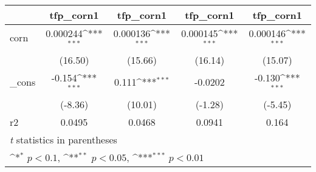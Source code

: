 {
\def\sym#1{\ifmmode^{#1}\else\(^{#1}\)\fi}
\begin{tabular}{l*{4}{c}}
\hline\hline
            &\multicolumn{1}{c}{tfp\_corn1}&\multicolumn{1}{c}{tfp\_corn1}&\multicolumn{1}{c}{tfp\_corn1}&\multicolumn{1}{c}{tfp\_corn1}\\
\hline
corn        &    0.000244\sym{***}&    0.000136\sym{***}&    0.000145\sym{***}&    0.000146\sym{***}\\
            &     (16.50)         &     (15.66)         &     (16.14)         &     (15.07)         \\
[1em]
\_cons      &      -0.154\sym{***}&       0.111\sym{***}&     -0.0202         &      -0.130\sym{***}\\
            &     (-8.36)         &     (10.01)         &     (-1.28)         &     (-5.45)         \\
\hline
r2          &      0.0495         &      0.0468         &      0.0941         &       0.164         \\
\hline\hline
\multicolumn{5}{l}{\footnotesize \textit{t} statistics in parentheses}\\
\multicolumn{5}{l}{\footnotesize \sym{*} \(p<0.1\), \sym{**} \(p<0.05\), \sym{***} \(p<0.01\)}\\
\end{tabular}
}
